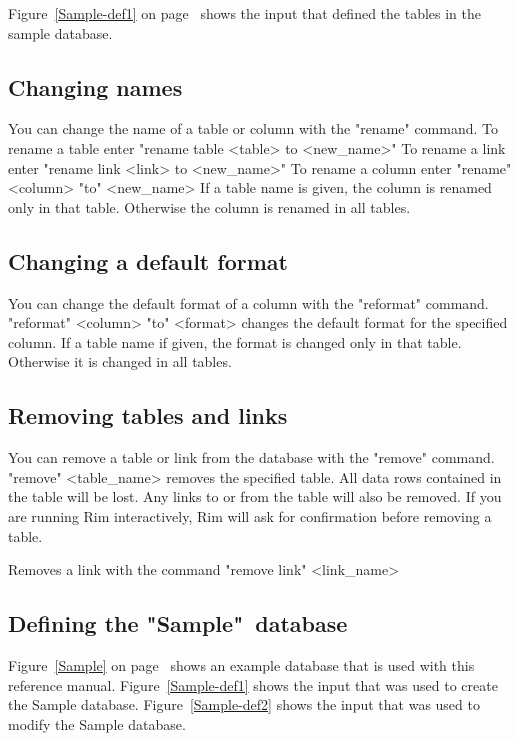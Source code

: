 Figure~\ref{Sample-def1}  on page~\pageref{Sample-def1} shows the input that
defined the tables in the sample database.
 
 
\subsection{Changing names}
You can change the name of a table or column with the "rename" command.
To rename a table
enter
\<"rename table <table> to <new_name>"\>
To rename a link
enter
\<"rename link <link> to <new_name>"\>
To rename a column
enter
\<"rename"  <column> "to" <new_name> \>
If a table name is given, the
column is renamed only in that table. Otherwise the column is
renamed in all tables.
 
\subsection{Changing a default format}
You can change the default format of a column with the "reformat" command.
\<"reformat" <column> "to" <format> \>
changes the default format for the specified column.
If a table name if given, the
format is changed only in that table. Otherwise it
is changed in all tables.
 
\subsection{Removing tables and links}
%
You can remove a table or link from the database with the "remove" command.
\<"remove"  <table_name>\>
removes the specified table.  All data rows contained in the
table will be lost.  Any links to or from the table
will also be removed.
If you are running Rim interactively, Rim will ask for
confirmation before removing a table.
 
Removes a link with the command
\<"remove link" <link_name>\>
 
\subsection{Defining the "Sample"\ database}
Figure~\ref{Sample} on page~\pageref{Sample} shows an example
database that is used
with this reference manual.  Figure~\ref{Sample-def1}
shows the input that was used to create the Sample database.
Figure~\ref{Sample-def2}
shows the input that was used to modify the Sample database.
 
